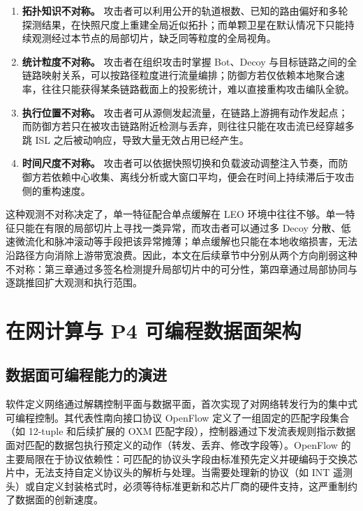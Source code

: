\begin{enumerate}
    \item \textbf{拓扑知识不对称。} 攻击者可以利用公开的轨道根数、已知的路由偏好和多轮探测结果，在快照尺度上重建全局近似拓扑；而单颗卫星在默认情况下只能持续观测经过本节点的局部切片，缺乏同等粒度的全局视角。
    \item \textbf{统计粒度不对称。} 攻击者在组织攻击时掌握 Bot、Decoy 与目标链路之间的全链路映射关系，可以按路径粒度进行流量编排；防御方若仅依赖本地聚合速率，往往只能获得某条链路截面上的投影统计，难以直接重构攻击编队全貌。
    \item \textbf{执行位置不对称。} 攻击者可从源侧发起流量，在链路上游拥有动作发起点；而防御方若只在被攻击链路附近检测与丢弃，则往往只能在攻击流已经穿越多跳 ISL 之后被动响应，导致大量无效占用已经产生。
    \item \textbf{时间尺度不对称。} 攻击者可以依据快照切换和负载波动调整注入节奏，而防御方若依赖中心收集、离线分析或大窗口平均，便会在时间上持续滞后于攻击侧的重构速度。
\end{enumerate}

这种观测不对称决定了，单一特征配合单点缓解在 LEO 环境中往往不够。单一特征只能在有限的局部切片上寻找一类异常，而攻击者可以通过多 Decoy 分散、低速微流化和脉冲滚动等手段把该异常摊薄；单点缓解也只能在本地收缩损害，无法沿路径方向消除上游带宽浪费。因此，本文在后续章节中分别从两个方向削弱这种不对称：第三章通过多签名检测提升局部切片中的可分性，第四章通过局部协同与逐跳推回扩大观测和执行范围。

\section{在网计算与 P4 可编程数据面架构}

\subsection{数据面可编程能力的演进}

软件定义网络通过解耦控制平面与数据平面，首次实现了对网络转发行为的集中式可编程控制。其代表性南向接口协议 OpenFlow 定义了一组固定的匹配字段集合（如 12-tuple 和后续扩展的 OXM 匹配字段），控制器通过下发流表规则指示数据面对匹配的数据包执行预定义的动作（转发、丢弃、修改字段等）。OpenFlow 的主要局限在于协议依赖性：可匹配的协议头字段由标准预先定义并硬编码于交换芯片中，无法支持自定义协议头的解析与处理。当需要处理新的协议（如 INT 遥测头）或自定义封装格式时，必须等待标准更新和芯片厂商的硬件支持，这严重制约了数据面的创新速度。

